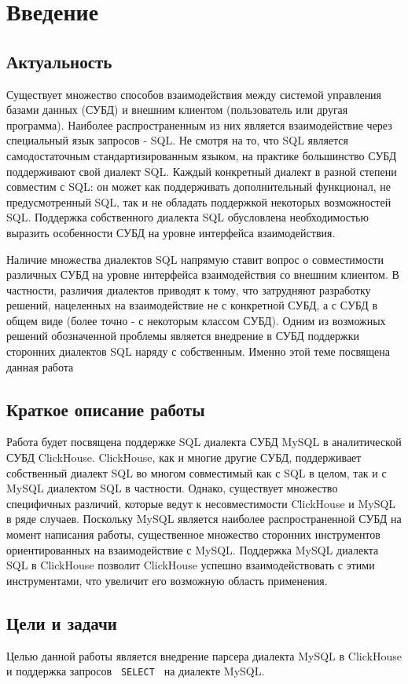 \section{Введение}
\subsection{Актуальность}
Существует множество способов взаимодействия между системой управления базами данных (СУБД) и внешним клиентом (пользователь или другая программа). Наиболее распространенным из них является взаимодействие через специальный язык запросов - SQL. Не смотря на то, что SQL является самодостаточным стандартизированным языком, на практике большинство СУБД поддерживают свой диалект SQL. Каждый конкретный диалект в разной степени совместим с SQL: он может как поддерживать дополнительный функционал, не предусмотренный SQL, так и не обладать поддержкой некоторых возможностей SQL. Поддержка собственного диалекта SQL обусловлена необходимостью выразить особенности СУБД на уровне интерфейса взаимодействия.

Наличие множества диалектов SQL напрямую ставит вопрос о совместимости различных СУБД на уровне интерфейса взаимодействия со внешним клиентом. В частности, различия диалектов приводят к тому, что затрудняют разработку решений, нацеленных на взаимодействие не с конкретной СУБД, а с СУБД в общем виде (более точно - с некоторым классом СУБД). Одним из возможных решений обозначенной проблемы является внедрение в СУБД поддержки сторонних диалектов SQL наряду с собственным. Именно этой теме посвящена данная работа

\subsection{Краткое описание работы}
Работа будет посвящена поддержке SQL диалекта СУБД MySQL в аналитической СУБД ClickHouse. ClickHouse, как и многие другие СУБД, поддерживает собственный диалект SQL во многом совместимый как с SQL в целом, так и с MySQL диалектом SQL в частности. Однако, существует множество специфичных различий, которые ведут к несовместимости ClickHouse и MySQL в ряде случаев. Поскольку MySQL является наиболее распространенной СУБД на момент написания работы, существенное множество сторонних инструментов ориентированных на взаимодействие с MySQL. Поддержка MySQL диалекта SQL в ClickHouse позволит ClickHouse успешно взаимодействовать с этими инструментами, что увеличит его возможную область применения.  

\subsection{Цели и задачи}
Целью данной работы является внедрение парсера диалекта MySQL в ClickHouse и поддержка запросов \texttt{ SELECT } на диалекте MySQL. 

